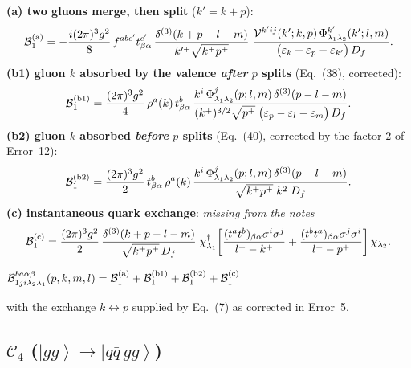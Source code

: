\documentclass[11pt]{article}
\newcommand{\eps}{\varepsilon}
\newcommand{\dg}{\dagger}
\newcommand{\dthree}{\delta^{(3)}}
\newcommand{\ket}[1]{\left|#1\right\rangle}
\newcommand{\Ph}{\Phi}
\newcommand{\Vg}{\mathcal{V}}
\begin{document}
\begin{res}
\textbf{(a) two gluons merge, then split} ($k'=k+p$):
\begin{equation}
\mathcal B_{1}^{(\rm a)}=-\frac{i(2\pi)^{3}g^{2}}{8}\,f^{abc'}t^{c'}_{\beta\alpha}\,
\frac{\dthree(k+p-l-m)}{k'^{+}\sqrt{k^{+}p^{+}}}\;
\frac{\Vg^{k'ij}(k';k,p)\,\Ph^{k'}_{\lambda_1\lambda_2}(k';l,m)}
{\big(\eps_{k}+\eps_{p}-\eps_{k'}\big)\,D_{f}} .
\end{equation}
\textbf{(b1) gluon $k$ absorbed by the valence \emph{after} $p$ splits} (Eq.~(38), corrected):
\begin{equation}
\mathcal B_{1}^{(\rm b1)}=\frac{(2\pi)^{3}g^{2}}{4}\,
\rho^{a}(k)\,t^{b}_{\beta\alpha}\,
\frac{k^{i}\,\Ph^{j}_{\lambda_1\lambda_2}(p;l,m)\,\dthree(p-l-m)}
{(k^{+})^{3/2}\sqrt{p^{+}}\;\big(\eps_{p}-\eps_{l}-\eps_{m}\big)\,D_{f}} .
\end{equation}
\textbf{(b2) gluon $k$ absorbed \emph{before} $p$ splits} (Eq.~(40), corrected by the factor $2$
of Error~12):
\begin{equation}
\mathcal B_{1}^{(\rm b2)}=\frac{(2\pi)^{3}g^{2}}{2}\,
t^{b}_{\beta\alpha}\,\rho^{a}(k)\,
\frac{k^{i}\,\Ph^{j}_{\lambda_1\lambda_2}(p;l,m)\,\dthree(p-l-m)}
{\sqrt{k^{+}p^{+}}\;k^{2}\;D_{f}} .
\end{equation}
\textbf{(c) instantaneous quark exchange}: \emph{missing from the notes}
\begin{equation}
\mathcal B_{1}^{(\rm c)}=\frac{(2\pi)^{3}g^{2}}{2}\,
\frac{\dthree(k+p-l-m)}{\sqrt{k^{+}p^{+}}\,D_{f}}\;
\chi^{\dg}_{\lambda_1}\!\left[\frac{(t^{a}t^{b})_{\beta\alpha}\sigma^{i}\sigma^{j}}{l^{+}-k^{+}}
+\frac{(t^{b}t^{a})_{\beta\alpha}\sigma^{j}\sigma^{i}}{l^{+}-p^{+}}\right]\chi_{\lambda_2}.
\end{equation}

\medskip
\centerline{$\displaystyle
\mathcal B^{ba\alpha\beta}_{1ji\lambda_2\lambda_1}(p,k,m,l)
=\mathcal B_{1}^{(\rm a)}+\mathcal B_{1}^{(\rm b1)}+\mathcal B_{1}^{(\rm b2)}+\mathcal B_{1}^{(\rm c)}$}
\end{res}

\noindent
with the exchange $k\!\leftrightarrow\! p$ supplied by Eq.~(7) as corrected in Error~5.

\subsection{$\mathcal C_4$ ($\ket{gg}\to\ket{q\bar q\,gg}$)}
\end{document}
